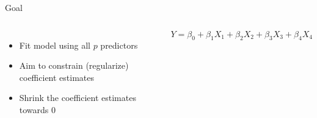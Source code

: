 \documentclass[aspectratio=169,usenames,dvipsnames]{beamer}
\newcommand{\InstructorList}[1]{
\begin{itemize}
	\color{orange}
	#1
\end{itemize}
}
\renewcommand{\InstructorList}[1]{}
\begin{document}
\begin{frame}[c]{Goal}

\begin{columns}
\centering
\begin{itemize}
	\item Fit model using all $p$ predictors
	\item Aim to constrain (regularize) coefficient estimates
	\item Shrink the coefficient estimates towards 0
\end{itemize}
\centering

\begin{equation*}
	Y = \beta_0 + \beta_1 X_1 + \beta_2 X_2 + \beta_3 X_3 + \beta_4 X_4
\end{equation*}
\InstructorList{
\item Ridge regression
\item Lasso
}
\end{columns}

\end{frame}
\end{document}
